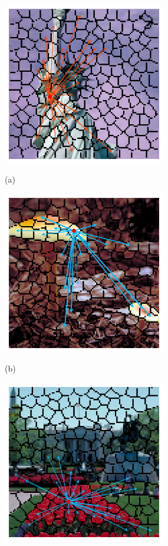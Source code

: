 \begin{figure}[!ht]
	\centering
	\begin{minipage}[t]{.49\linewidth}
		\includegraphics[width=2.8in]{images/lady_superpixel.jpg}
		\centerline{(a)}
		\label{LADY}
	\end{minipage}
	\begin{minipage}[t]{.49\linewidth}
		\includegraphics[width=2.8in]{images/shroom_superpixel.jpg}
		\centerline{(b)}
		\label{SHROOM}
	\end{minipage}
	\begin{minipage}[t]{.49\linewidth}
		\includegraphics[width=2.8in]{images/flower_superpixel.jpg}

\end{minipage}
\end{figure}
